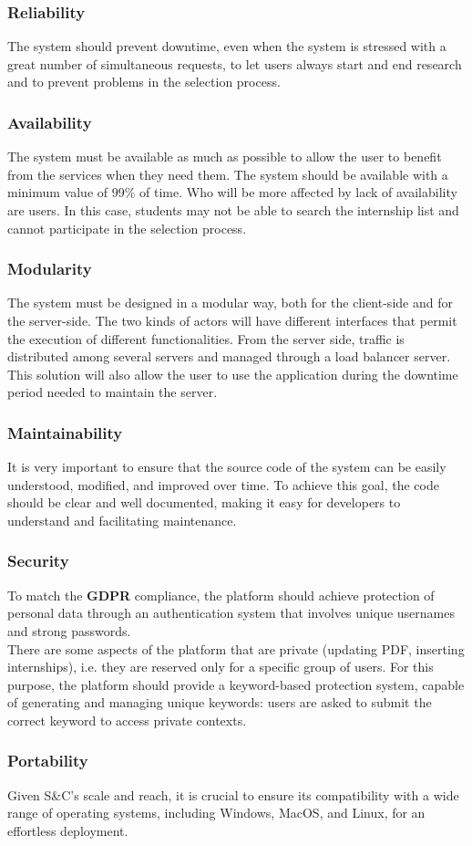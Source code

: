 \subsubsection{Reliability}
The system should prevent downtime, even when the system is stressed with a great number of simultaneous requests, to let users always start and end research and to prevent problems in the selection process.

\subsubsection{Availability}
The system must be available as much as possible to allow the user to benefit from the services when they need them. The system should be available with a minimum value of 99\% of time. Who will be more affected by lack of availability are users. In this case, students may not be able to search the internship list and cannot participate in the selection process.

\subsubsection{Modularity}
The system must be designed in a modular way, both for the client-side and for the server-side. The two kinds of actors will have different interfaces that permit the execution of different functionalities. From the server side, traffic is distributed among several servers and managed through a load balancer server. This solution will also allow the user to use the application during the downtime period needed to maintain the server.

\subsubsection{Maintainability}
It is very important to ensure that the source code of the system can be easily understood, modified, and improved over time. To achieve this goal, the code should be clear and well documented, making it easy for developers to understand and facilitating maintenance.

\subsubsection{Security}
To match the \textbf{GDPR} compliance, the platform should achieve protection of personal data through an authentication system that involves unique usernames and strong passwords.\\ 
There are some aspects of the platform that are private (updating PDF, inserting internships), i.e. they are reserved only for a specific group of users. For this purpose, the platform should provide a keyword-based protection system, capable of generating and managing unique keywords: users are asked to submit the correct keyword to access private contexts. 

\subsubsection{Portability}
Given S\&C's scale and reach, it is crucial to ensure its compatibility with a wide range of operating systems, including Windows, MacOS, and Linux, for an effortless deployment. 